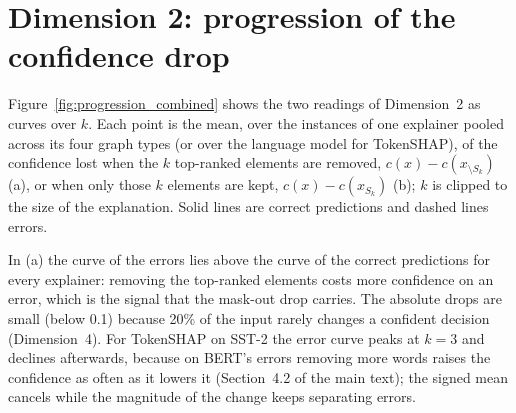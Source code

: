 \documentclass[3p,times,10pt,nopreprintline]{elsarticle}
\begin{document}
\begin{table}[H]
\centering
\scriptsize
\setlength{\tabcolsep}{4pt}
\caption{Seed replicates of the distilled and of the gold-trained surrogate (same graphs, node features, architecture and protocol; different random seed), against BERT's gold-label errors on the test split: accuracy with respect to the gold labels, agreement with BERT's predictions, fraction of BERT's errors that the surrogate also makes, Jaccard index of the two error sets, and fraction of BERT's errors on which the surrogate is confident (\(>0.9\)) and agrees with BERT.}
\label{tab:seed_replicates}
\end{table}

\clearpage
\section{Dimension 2: progression of the confidence drop}

Figure~\ref{fig:progression_combined} shows the two readings of Dimension~2 as curves over \(k\). Each point is the mean, over the instances of one explainer pooled across its four graph types (or over the language model for TokenSHAP), of the confidence lost when the \(k\) top-ranked elements are removed, \(c(x)-c(x_{\setminus S_k})\) (a), or when only those \(k\) elements are kept, \(c(x)-c(x_{S_k})\) (b); \(k\) is clipped to the size of the explanation. Solid lines are correct predictions and dashed lines errors.

In (a) the curve of the errors lies above the curve of the correct predictions for every explainer: removing the top-ranked elements costs more confidence on an error, which is the signal that the mask-out drop carries. The absolute drops are small (below 0.1) because 20\% of the input rarely changes a confident decision (Dimension~4). For TokenSHAP on SST-2 the error curve peaks at \(k=3\) and declines afterwards, because on BERT's errors removing more words raises the confidence as often as it lowers it (Section~4.2 of the main text); the signed mean cancels while the magnitude of the change keeps separating errors.
\end{document}
